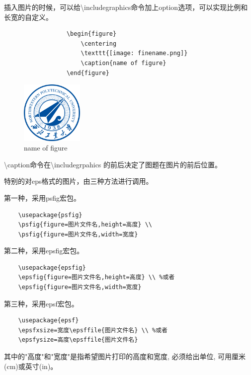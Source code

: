 \documentclass[12pt]{book}
\begin{document}
插入图片的时候，可以给\textbackslash includegraphics命令加上option选项，可以实现比例和长宽的自定义。
\begin{figure}[htbp]
	\begin{minipage}{0.45\textwidth}
		\begin{verbatim}
			\begin{figure}
				\centering
				\texttt{[image: finename.png]}
				\caption{name of figure}
			\end{figure}
		\end{verbatim}
	\end{minipage}
	\begin{minipage}{0.45\textwidth}
		\centering
		\includegraphics[width=3cm]{logo.png}
		\caption{name of figure}
	\end{minipage}
\end{figure}

\textbackslash caption命令在\textbackslash includegrpahics 的前后决定了图题在图片的前后位置。

特别的对eps格式的图片，由三种方法进行调用。

第一种，采用psfig宏包。

\begin{verbatim}
	\usepackage{psfig}
	\psfig{figure=图片文件名,height=高度} \\
	\psfig{figure=图片文件名,width=宽度}
\end{verbatim}

第二种，采用epsfig宏包。

\begin{verbatim}
	\usepackage{epsfig}
	\epsfig{figure=图片文件名,height=高度} \\ %或者
	\epsfig{figure=图片文件名,width=宽度}
\end{verbatim}


第三种，采用epsf宏包。

\begin{verbatim}
	\usepackage{epsf}
	\epsfxsize=宽度\epsffile{图片文件名} \\ %或者
	\epsfysize=高度\epsffile{图片文件名}
\end{verbatim}

其中的"高度"和"宽度"是指希望图片打印的高度和宽度, 必须给出单位, 可用厘米(cm)或英寸(in)。
\end{document}
